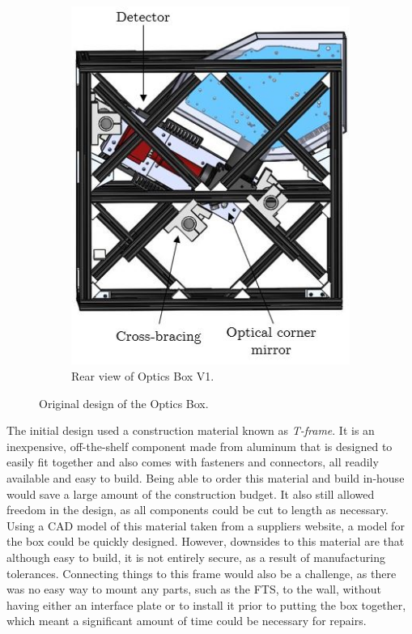 \begin{figure}
\begin{subfigure}[h]{0.42\textwidth}
        \includegraphics[width=\textwidth]{chap3_images/LIFE_V1_images/Optics_Box_V1_V0_rear_view_labelled.JPG}
        \caption{Rear view of Optics Box V1.}
        \label{fig:OB_V1_rear}
    \end{subfigure}
    \caption{Original design of the Optics Box.}
    \label{fig:OB_V1}
\end{figure}

The initial design used a construction material known as \textit{T-frame}. It is an inexpensive, off-the-shelf component made from aluminum that is designed to easily fit together and also comes with fasteners and connectors, all readily available and easy to build. Being able to order this material and build in-house would save a large amount of the construction budget. It also still allowed freedom in the design, as all components could be cut to length as necessary. Using a CAD model of this material taken from a suppliers website, a model for the box could be quickly designed. However, downsides to this material are that although easy to build, it is not entirely secure, as a result of manufacturing tolerances. Connecting things to this frame would also be a challenge, as there was no easy way to mount any parts, such as the FTS, to the wall, without having either an interface plate or to install it prior to putting the box together, which meant a significant amount of time could be necessary for repairs.

